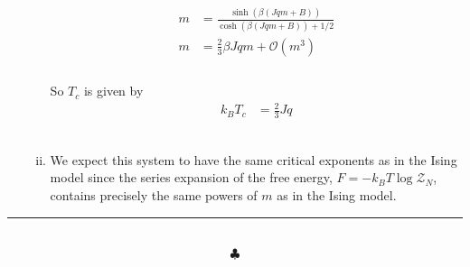 \documentclass[]{article}
\begin{document}
\begin{enumerate}[1.]
\begin{enumerate}[i.]
\begin{equation}
\begin{aligned}
m & = \frac{   \sinh(  \beta  (J q m  + B)   )  }{   \cosh( \beta  (J q m  + B)   )  +  1/2  } \\
m & = \frac{2}{3} \beta Jq m + \mathcal{O}(m^3) \\
\end{aligned}
\end{equation} \\

So $T_c$ is given by \\

\begin{equation}
\begin{aligned}
k_B T_c & = \frac{2}{3}  Jq  
\end{aligned}
\end{equation} \\



\item We expect this system to have the same critical exponents as in the Ising model since the series expansion of the free energy, $F = - k_B T \log \mathcal{Z}_N$, contains precisely the same powers of $m$ as in the Ising model. \\


\end{enumerate}


\end{enumerate}



\noindent\rule{15cm}{0.4pt} \\

$$\clubsuit$$
\end{document}
